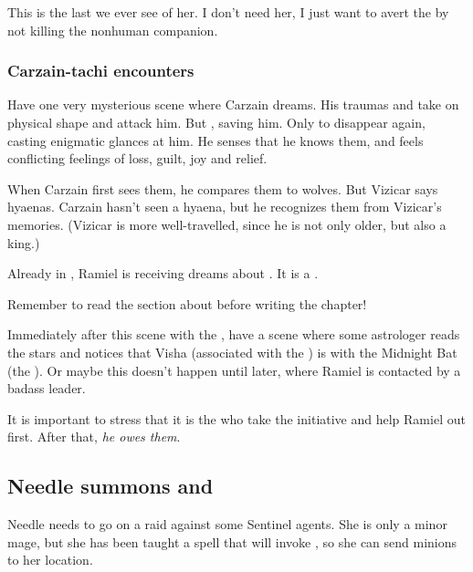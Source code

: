 \begin{garbage}
This is the last we ever see of her. 
I don't need her, I just want to avert the  by not killing the nonhuman companion. 





\subsubsection{Carzain-tachi encounters \vorcanths}
Have one very mysterious scene where Carzain dreams. 
His traumas and  take on physical shape and attack him. 
But , saving him. 
Only to disappear again, casting enigmatic glances at him. 
He senses that he knows them, and feels conflicting feelings of loss, guilt, joy and relief.

When Carzain first sees them, he compares them to wolves. But Vizicar says hyaenas. Carzain hasn't seen a hyaena, but he recognizes them from Vizicar's memories. (Vizicar is more well-travelled, since he is not only older, but also a king.)

Already in \emph{\TwilightAngelRemember}, Ramiel is receiving dreams about \vorcanths. 
It is a . 

Remember to read the section about \hs{\vorcanths} before writing the chapter!

Immediately after this scene with the \vorcanth{}, have a scene where some astrologer reads the stars and notices that Visha (associated with the \hs{\vorcanth{} \matrix}) is  with the Midnight Bat (the ). 
Or maybe this doesn't happen until later, where Ramiel is contacted by a badass \vorcanth{} leader. 

It is important to stress that it is the \vorcanths{} who take the initiative and help Ramiel out first. After that, \emph{he owes them}. 






\subsection{Needle summons \banes{} and \banerats}
Needle needs to go on a raid against some Sentinel agents. 
She is only a minor mage, but she has been taught a spell that will invoke \Achsah{}, so she can send minions to her location. 






\end{garbage}
